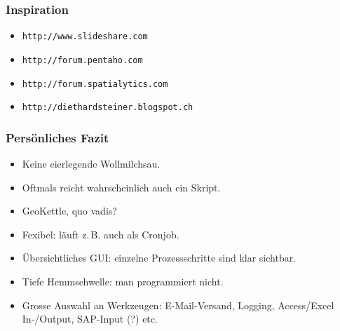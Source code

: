 \documentclass{beamer}
\begin{document}
\begin{frame}
  \frametitle{Inspiration}
  \begin{itemize}
  \item \texttt{http://www.slideshare.com}
  \item \texttt{http://forum.pentaho.com}
  \item \texttt{http://forum.spatialytics.com}
  \item \texttt{http://diethardsteiner.blogspot.ch}
 \end{itemize}
\end{frame}

\begin{frame}
  \frametitle{Persönliches Fazit}
  \begin{itemize}
  \item Keine eierlegende Wollmilchsau.
  \item Oftmals reicht wahrscheinlich auch ein Skript.
  \item GeoKettle, quo vadis?
 \end{itemize}
  \begin{itemize}
  \item Fexibel: läuft z.\,B. auch als Cronjob.
  \item Übersichtliches GUI: einzelne Prozessschritte sind klar sichtbar.
  \item Tiefe Hemmschwelle: man programmiert nicht.
  \item Grosse Auswahl an Werkzeugen: E-Mail-Versand, Logging, Access/Excel In-/Output, SAP-Input (?) etc.
 \end{itemize}
\end{frame}
\end{document}
